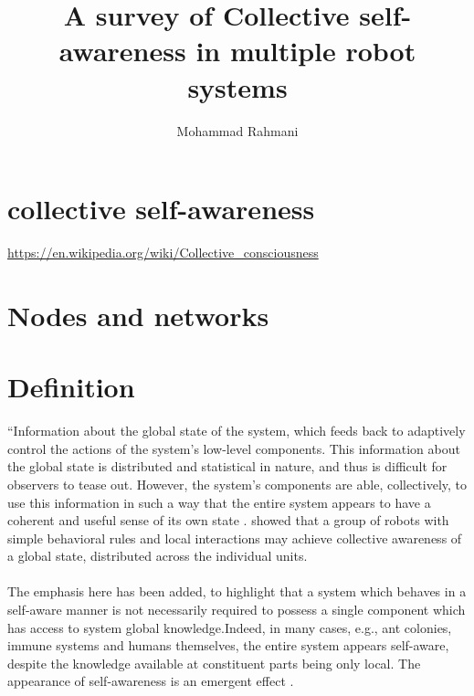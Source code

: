 \documentclass{article}
\begin{document}
	
	\title{A survey of Collective self-awareness in multiple robot systems}
	\author{Mohammad Rahmani}
	\date{}
	\maketitle
	\section{collective self-awareness}
		\cite{diaconescu-2017-architectures-for-collective-self-aware-computing-systems}
		\cite{kephart-2017-self-adaptation-in-collective-self-aware-computing-systems}
		\url{https://en.wikipedia.org/wiki/Collective_consciousness}
	\section{Nodes and networks}
		\cite{agne-2016-self-aware-compute-nodes}
	\section{Definition}
		“Information about the global state of the system, which feeds back to adaptively control the actions of the system’s low-level components. This information about the global state is distributed and statistical in nature, and thus is difficult for observers to tease out. However, the system’s components are able, collectively, to use this information in such a way that the entire system appears to have a coherent and useful sense of its own state \citep{mitchell-2005-self-awareness-and-control-in-decentralized-systems}. \cite{schmickl-2011-cocoro-the-self-aware-underwater-swarm} showed that a group of robots with simple behavioral rules
		and local interactions may achieve collective awareness of a global state, distributed across the individual units.
		
		\paragraph{} The emphasis here has been added, to highlight that a system which behaves in a self-aware manner is not necessarily required to possess a single component which has access to system global knowledge.Indeed, in many cases, e.g., ant colonies, immune systems and humans themselves, the entire system appears self-aware, despite the knowledge available at constituent parts being only local. The appearance of self-awareness is an emergent effect \citet{mitchell-2005-self-awareness-and-control-in-decentralized-systems}.
\end{document}
